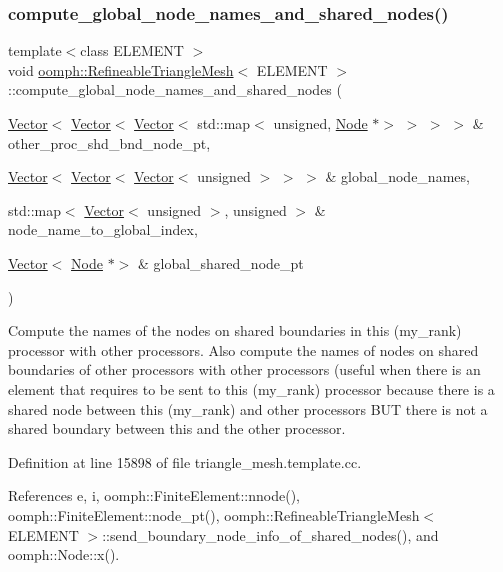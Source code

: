 \subsubsection{\texorpdfstring{compute\+\_\+global\+\_\+node\+\_\+names\+\_\+and\+\_\+shared\+\_\+nodes()}{compute\_global\_node\_names\_and\_shared\_nodes()}}
{\footnotesize\ttfamily template$<$class E\+L\+E\+M\+E\+NT $>$ \\
void \hyperlink{classoomph_1_1RefineableTriangleMesh}{oomph\+::\+Refineable\+Triangle\+Mesh}$<$ E\+L\+E\+M\+E\+NT $>$\+::compute\+\_\+global\+\_\+node\+\_\+names\+\_\+and\+\_\+shared\+\_\+nodes (\begin{DoxyParamCaption}\item[{\hyperlink{classoomph_1_1Vector}{Vector}$<$ \hyperlink{classoomph_1_1Vector}{Vector}$<$ \hyperlink{classoomph_1_1Vector}{Vector}$<$ std\+::map$<$ unsigned, \hyperlink{classoomph_1_1Node}{Node} $\ast$$>$ $>$ $>$ $>$ \&}]{other\+\_\+proc\+\_\+shd\+\_\+bnd\+\_\+node\+\_\+pt,  }\item[{\hyperlink{classoomph_1_1Vector}{Vector}$<$ \hyperlink{classoomph_1_1Vector}{Vector}$<$ \hyperlink{classoomph_1_1Vector}{Vector}$<$ unsigned $>$ $>$ $>$ \&}]{global\+\_\+node\+\_\+names,  }\item[{std\+::map$<$ \hyperlink{classoomph_1_1Vector}{Vector}$<$ unsigned $>$, unsigned $>$ \&}]{node\+\_\+name\+\_\+to\+\_\+global\+\_\+index,  }\item[{\hyperlink{classoomph_1_1Vector}{Vector}$<$ \hyperlink{classoomph_1_1Node}{Node} $\ast$$>$ \&}]{global\+\_\+shared\+\_\+node\+\_\+pt }\end{DoxyParamCaption})\hspace{0.3cm}{\ttfamily [protected]}}



Compute the names of the nodes on shared boundaries in this (my\+\_\+rank) processor with other processors. Also compute the names of nodes on shared boundaries of other processors with other processors (useful when there is an element that requires to be sent to this (my\+\_\+rank) processor because there is a shared node between this (my\+\_\+rank) and other processors B\+UT there is not a shared boundary between this and the other processor. 



Definition at line 15898 of file triangle\+\_\+mesh.\+template.\+cc.



References e, i, oomph\+::\+Finite\+Element\+::nnode(), oomph\+::\+Finite\+Element\+::node\+\_\+pt(), oomph\+::\+Refineable\+Triangle\+Mesh$<$ E\+L\+E\+M\+E\+N\+T $>$\+::send\+\_\+boundary\+\_\+node\+\_\+info\+\_\+of\+\_\+shared\+\_\+nodes(), and oomph\+::\+Node\+::x().



